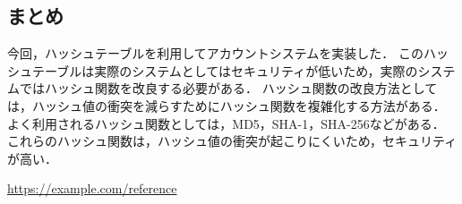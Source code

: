 \documentclass{ltjsarticle}
\begin{document}
\subsection{まとめ}
今回，ハッシュテーブルを利用してアカウントシステムを実装した．
このハッシュテーブルは実際のシステムとしてはセキュリティが低いため，実際のシステムではハッシュ関数を改良する必要がある．
ハッシュ関数の改良方法としては，ハッシュ値の衝突を減らすためにハッシュ関数を複雑化する方法がある．
よく利用されるハッシュ関数としては，MD5，SHA-1，SHA-256などがある．
これらのハッシュ関数は，ハッシュ値の衝突が起こりにくいため，セキュリティが高い．

\begin{thebibliography}{9}
 \url{https://example.com/reference}
\end{thebibliography}
\end{document}
